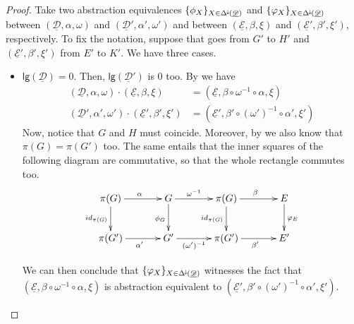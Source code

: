 \documentclass[a4paper,UKenglish,cleveref,pdftex, thm-restate,numberwithinsect]{lipics}
\newcommand{\Deltamin}{\Delta^{\hspace{-1pt}\downarrow\hspace{-1pt}}}
\newcommand{\id}[1]{\mathsf{id}_{#1}}
\newcommand{\dder}[1]{\mathscr{#1}}
\newcommand{\der}[1]{\underline{\dder{#1}}}
\newcommand{\lgh}[0]{\mathsf{lg}}
\begin{document}
\begin{proof} Take two abstraction equivalences $\{\phi_X\}_{X\in \Deltamin(\der{D})}$ and $\{\varphi_X\}_{X\in \Deltamin(\der{D})}$ between $(\der{D}, \alpha, \omega)$ and $(\der{D}', \alpha', \omega')$ and between $(\der{E}, \beta, \xi)$ and $(\der{E}', \beta', \xi')$, respectively. To fix the notation, suppose that goes from $G'$ to $H'$ and $(\der{E}', \beta', \xi')$ from $E'$ to $K'$. We have three cases.
	
\begin{itemize}
	\item $\lgh(\der{D})=0$. Then, $\lgh(\der{D}')$ is $0$ too. By  we have
	\begin{align*}
	(\der{D}, \alpha, \omega)\cdot (\der{E}, \beta, \xi)&=(\der{E}, \beta\circ \omega^{-1}\circ \alpha, \xi)\\
		(\der{D}', \alpha', \omega')\cdot (\der{E}', \beta', \xi')&=(\der{E}', \beta'\circ (\omega')^{-1}\circ \alpha', \xi')
	\end{align*}
 Now, notice that $G$ and $H$ must coincide. Moreover, by  we also know that $\pi(G)=\pi(G')$ too. The same  entails that the inner squares of the following diagram are commutative, so that the whole rectangle commutes too.
 \[\xymatrix@C=35pt{\pi(G) \ar[r]^{\alpha} \ar[d]_{\id{\pi(G)}}& G  \ar[d]_{\phi_G}\ar[r]^-{\omega^{-1}} & \pi(G) \ar[d]_{\id{\pi(G)}} \ar[r]^{\beta}& E \ar[d]^{\varphi_E}\\\pi(G') \ar[r]_{\alpha'}& G' \ar[r]_-{(\omega')^{-1}} & \pi(G') \ar[r]_{\beta'} & E'}\]
 
 We can  then conclude that $\{\varphi_X\}_{X\in \Deltamin(\der{D})}$ witnesses the fact that $(\der{E}, \beta\circ \omega^{-1}\circ \alpha, \xi)$ is abstraction equivalent to $(\der{E}', \beta'\circ (\omega')^{-1}\circ \alpha', \xi')$.


\end{itemize}
\end{proof}
\end{document}
